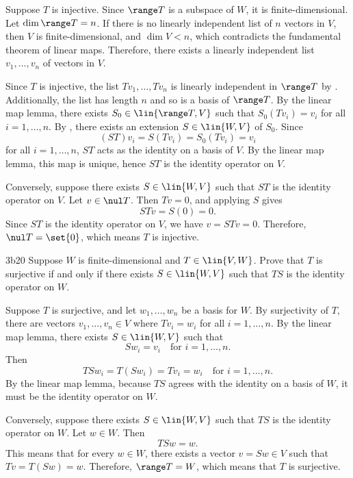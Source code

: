 \begin{sol}
    Suppose $T$ is injective.
	Since $\range T$ is a subspace of $W$, it is finite-dimensional.
    Let $\dim \range T = n$.
    If there is no linearly independent list of $n$ vectors in $V$, then $V$ is finite-dimensional, and $\dim V < n$, which contradicts the fundamental theorem of linear maps.
    Therefore, there exists a linearly independent list $v_1, \ldots, v_n$ of vectors in $V$.

    Since $T$ is injective, the list $Tv_1, \ldots, Tv_n$ is linearly independent in $\range T$ by .
    Additionally, the list has length $n$ and so is a basis of $\range T$.
    By the linear map lemma, there exists $S_0 \in \lin{\range T, V}$ such that $S_0(Tv_i) = v_i$ for all $i = 1, \ldots, n$.
    By , there exists an extension $S \in \lin{W, V}$ of $S_0$. Since
    \[
        (ST)v_i = S(Tv_i) = S_0(Tv_i) = v_i
    \]
    for all $i = 1, \ldots, n$, $ST$ acts as the identity on a basis of $V$.
    By the linear map lemma, this map is unique, hence $ST$ is the identity operator on $V$.

    Conversely, suppose there exists $S \in \lin{W, V}$ such that $ST$ is the identity operator on $V$.
	Let $v \in \nul T$.
	Then $Tv = 0$, and applying $S$ gives
    \[
    	STv = S(0) = 0.
    \]
    Since $ST$ is the identity operator on $V$, we have $v = STv = 0$.
	Therefore, $\nul T = \set{0}$, which means $T$ is injective.
\end{sol}

\begin{exercise}{3b20}
    Suppose $W$ is finite-dimensional and $T \in \lin{V, W}$.
	Prove that $T$ is surjective if and only if there exists $S \in \lin{W, V}$ such that $TS$ is the identity operator on $W$.
\end{exercise}

\begin{sol}
    Suppose $T$ is surjective, and let $w_1, \ldots, w_n$ be a basis for $W$.
    By surjectivity of $T$, there are vectors $v_1, \ldots, v_n \in V$ where $Tv_i = w_i$ for all $i = 1, \ldots, n$.
    By the linear map lemma, there exists $S \in \lin{W, V}$ such that
    \[
        Sw_i = v_i \quad \text{for } i = 1, \ldots, n.
    \]
    Then
    \[
        TSw_i = T(Sw_i) = Tv_i = w_i \quad \text{for } i = 1, \ldots, n.
    \]
    By the linear map lemma, because $TS$ agrees with the identity on a basis of $W$, it must be the identity operator on $W$.

    Conversely, suppose there exists $S \in \lin{W, V}$ such that $TS$ is the identity operator on $W$.
	Let $w \in W$.
	Then
    \[
    	TSw = w.
    \]
    This means that for every $w \in W$, there exists a vector $v = Sw \in V$ such that $Tv = T(Sw) = w$.
	Therefore, $\range T = W$, which means that $T$ is surjective.
\end{sol}

